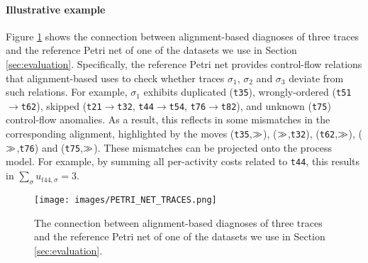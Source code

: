 \paragraph{Illustrative example}Figure \ref{PETRI_NET_TRACES} shows the connection between alignment-based  diagnoses of three traces and the reference Petri net of one of the datasets we use in Section \ref{sec:evaluation}. Specifically, the reference Petri net provides control-flow relations that alignment-based  uses to check whether traces $\sigma_1$, $\sigma_2$ and $\sigma_3$ deviate from such relations. For example, $\sigma_1$ exhibits duplicated (\texttt{t35}), wrongly-ordered (\texttt{t51}$\rightarrow$\texttt{t62}), skipped (\texttt{t21}$\rightarrow$\texttt{t32}, \texttt{t44}$\rightarrow$\texttt{t54}, \texttt{t76}$\rightarrow$\texttt{t82}), and unknown (\texttt{t75}) control-flow anomalies. As a result, this reflects in some mismatches in the corresponding alignment, highlighted by the moves (\texttt{t35},$\gg$), ($\gg$,\texttt{t32}), (\texttt{t62},$\gg$), ($\gg$,\texttt{t76}) and (\texttt{t75},$\gg$). These mismatches can be projected onto the process model. For example, by summing all per-activity costs related to \texttt{t44}, this results in $\sum_{\sigma}u_{t44,\sigma}=3$.
\begin{figure*}[!t]
\centering
\texttt{[image: images/PETRI\_NET\_TRACES.png]}
\caption{The connection between alignment-based  diagnoses of three traces and the reference Petri net of one of the datasets we use in Section \ref{sec:evaluation}.}
\label{PETRI_NET_TRACES}
\end{figure*}

